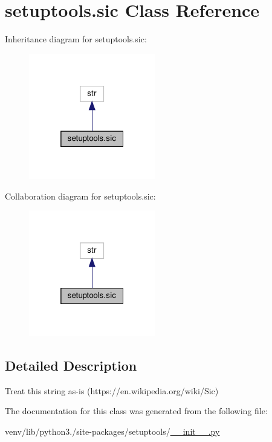 \hypertarget{classsetuptools_1_1sic}{}\section{setuptools.\+sic Class Reference}
\label{classsetuptools_1_1sic}


Inheritance diagram for setuptools.\+sic\+:
\nopagebreak
\begin{figure}[H]
\begin{center}
\leavevmode
\includegraphics[width=157pt]{classsetuptools_1_1sic__inherit__graph}
\end{center}
\end{figure}


Collaboration diagram for setuptools.\+sic\+:
\nopagebreak
\begin{figure}[H]
\begin{center}
\leavevmode
\includegraphics[width=157pt]{classsetuptools_1_1sic__coll__graph}
\end{center}
\end{figure}


\subsection{Detailed Description}
\begin{DoxyVerb}Treat this string as-is (https://en.wikipedia.org/wiki/Sic)\end{DoxyVerb}
 

The documentation for this class was generated from the following file\+:\begin{DoxyCompactItemize}
\item 
venv/lib/python3./site-\/packages/setuptools/\hyperlink{venv_2lib_2python3_89_2site-packages_2setuptools_2____init_____8py}{\+\_\+\+\_\+init\+\_\+\+\_\+.\+py}\end{DoxyCompactItemize}
